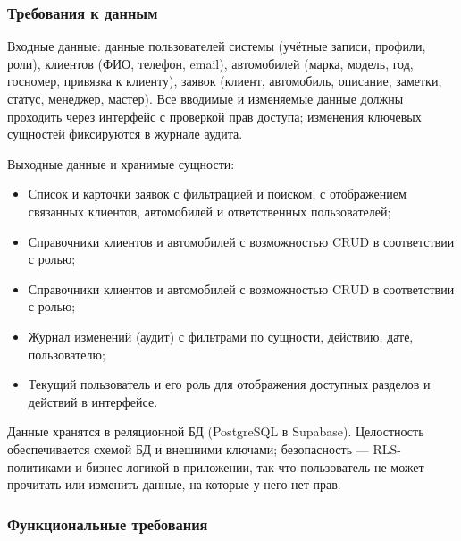 \subsubsection{Требования к данным}

Входные данные:  данные пользователей системы (учётные записи, профили, роли), клиентов (ФИО, телефон, email), автомобилей (марка, модель, год, госномер, привязка к клиенту), заявок (клиент, автомобиль, описание, заметки, статус, менеджер, мастер). Все вводимые и изменяемые данные должны проходить через интерфейс с проверкой прав доступа; изменения ключевых сущностей фиксируются в журнале аудита.

Выходные данные и хранимые сущности:
\begin{itemize}
	\item Список и карточки заявок с фильтрацией и поиском, с отображением связанных клиентов, автомобилей и ответственных пользователей;
	\item Справочники клиентов и автомобилей с возможностью CRUD в соответствии с ролью;
	\item Справочники клиентов и автомобилей с возможностью CRUD в соответствии с ролью;
	\item Журнал изменений (аудит) с фильтрами по сущности, действию, дате, пользователю;
	\item Текущий пользователь и его роль для отображения доступных разделов и действий в интерфейсе.
\end{itemize}

Данные хранятся в реляционной БД (PostgreSQL в Supabase). Целостность обеспечивается схемой БД и внешними ключами; безопасность — RLS-политиками и бизнес-логикой в приложении, так что пользователь не может прочитать или изменить данные, на которые у него нет прав.

\subsubsection{Функциональные требования}

